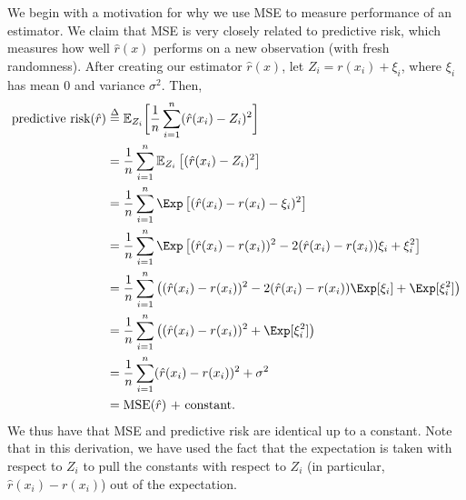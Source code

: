 We begin with a motivation for why we use MSE to measure performance of an estimator. We claim that MSE is very closely related to predictive risk, which measures how well $\hat r(x)$ performs on a new observation (with fresh randomness). After creating our estimator $\hat r(x)$, let $Z_i = r(x_i) + \xi_i$, where $\xi_i$ has mean 0 and variance $\sigma^2$. Then,
\begin{align}
	\text{predictive risk}(\hat r) &\stackrel{\Delta}{=} \mathbb{E
	}_{Z_i}\biggl[\frac{1}{n}\sum_{i=1}^n (\hat r(x_i) - Z_i)^2\biggr] \nonumber \\
	&= \frac{1}{n}\sum_{i=1}^n \mathbb{E}_{Z_i}\left[(\hat r(x_i) - Z_i)^2 \right] \nonumber \\
	&= \frac{1}{n}\sum_{i=1}^n \Exp\left[(\hat r(x_i) - r(x_i) - \xi_i)^2 \right] \nonumber \\
	&= \frac{1}{n}\sum_{i=1}^n \Exp\left[(\hat r(x_i) - r(x_i))^2 - 2(\hat r(x_i) - r(x_i))\xi_i + \xi_i ^2 \right] \nonumber \\
	&= \frac{1}{n}\sum_{i=1}^n \left((\hat r(x_i) - r(x_i))^2 - 2 (\hat r(x_i) - r(x_i))\Exp[\xi_i]  + \Exp[\xi_i^2] \right) \nonumber \\
	&= \frac{1}{n}\sum_{i=1}^n \left((\hat r(x_i) - r(x_i))^2 +  \Exp[\xi_i^2] \right) \nonumber \\
	&= \frac{1}{n}\sum_{i=1}^n (\hat r(x_i) - r(x_i))^2 + \sigma^2 \nonumber \\
	&= \text{MSE$(\hat r)$ + constant}.
\end{align}
We thus have that MSE and predictive risk are identical up to a constant. Note that in this derivation, we have used the fact that the expectation is taken with respect to $Z_i$ to pull the constants with respect to $Z_i$ (in particular, $\hat r(x_i) - r(x_i)$) out of the expectation. 

